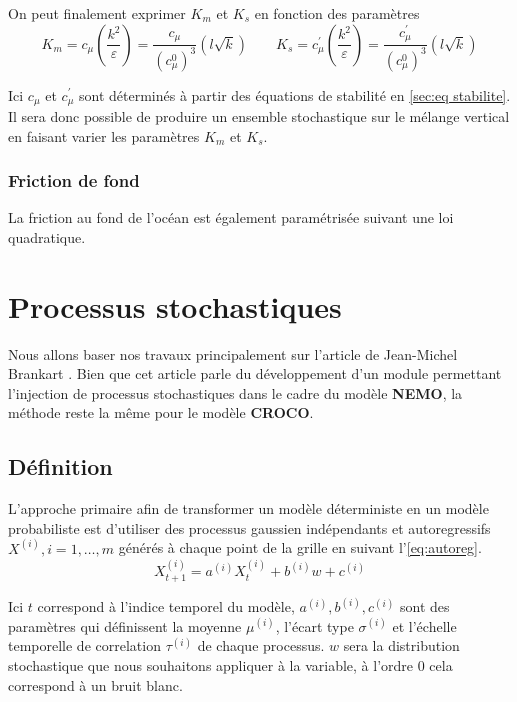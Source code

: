 On peut finalement exprimer $K_m$ et $K_s$ en fonction des paramètres
\begin{equation}
	K_m = c_\mu \left( \frac{k^2}{\varepsilon} \right) = \frac{c_\mu}{(c_\mu^0)^{3}} (l \sqrt{k}) \qquad K_s = c_\mu^{'} \left(\frac{k^2}{\varepsilon}\right) = \frac{c_\mu^{'}}{(c_\mu^0)^{3}} (l \sqrt{k})
\end{equation}

Ici $c_\mu$ et $c_\mu^{'}$ sont déterminés à partir des équations de stabilité en \autoref{sec:eq stabilite}. Il sera donc possible de produire un ensemble stochastique sur le mélange vertical en faisant varier les paramètres $K_m$ et $K_s$.

\subsubsection{Friction de fond}
La friction au fond de l'océan est également paramétrisée suivant une loi quadratique.

\section{Processus stochastiques}
Nous allons baser nos travaux principalement sur l'article de Jean-Michel Brankart \cite{brankart_generic_2015}. Bien que cet article parle du développement d'un module permettant l'injection de processus stochastiques dans le cadre du modèle \textbf{NEMO}, la méthode reste la même pour le modèle \textbf{CROCO}.

\subsection{Définition}
L'approche primaire afin de transformer un modèle déterministe en un modèle probabiliste est d'utiliser des processus gaussien indépendants et autoregressifs $X^{(i)}, i=1,\ldots,m$ générés à chaque point de la grille en suivant l'\autoref{eq:autoreg}.
\begin{equation} \label{eq:autoreg}
	X^{(i)}_{t+1} = a^{(i)} X^{(i)}_t + b^{(i)} w + c^{(i)}
\end{equation}

Ici $t$ correspond à l'indice temporel du modèle, $a^{(i)}, b^{(i)}, c^{(i)}$ sont des paramètres qui définissent la moyenne $\mu^{(i)}$, l'écart type $\sigma^{(i)}$ et l'échelle temporelle de correlation $\tau^{(i)}$ de chaque processus. $w$ sera la distribution stochastique que nous souhaitons appliquer à la variable, à l'ordre 0 cela correspond à un bruit blanc.

